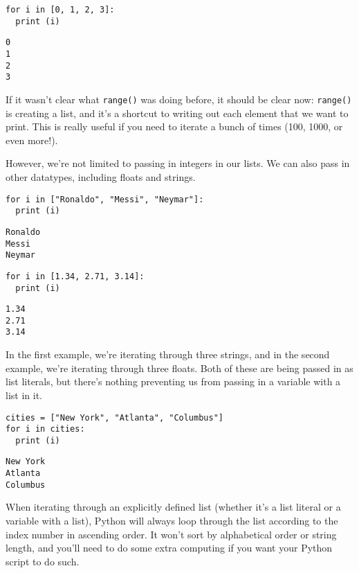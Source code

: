 \begin{lstlisting}[style=pippython]
for i in [0, 1, 2, 3]:
  print (i)
\end{lstlisting}
\begin{lstlisting}[style=none]
0
1
2
3
\end{lstlisting}
If it wasn't clear what \verb|range()| was doing before, it should be clear now: \verb|range()| is creating a list, and it's a shortcut to writing out each element that we want to print. This is really useful if you need to iterate a bunch of times (100, 1000, or even more!). \par
However, we're not limited to passing in integers in our lists. We can also pass in other datatypes, including floats and strings.\par
\begin{lstlisting}[style=pippython]
for i in ["Ronaldo", "Messi", "Neymar"]:
  print (i)
\end{lstlisting}
\begin{lstlisting}
Ronaldo
Messi
Neymar
\end{lstlisting}
\begin{lstlisting}[style=pippython]
for i in [1.34, 2.71, 3.14]:
  print (i)
\end{lstlisting}
\begin{lstlisting}
1.34
2.71
3.14
\end{lstlisting}
In the first example, we're iterating through three strings, and in the second example, we're iterating through three floats. Both of these are being passed in as list literals, but there's nothing preventing us from passing in a variable with a list in it.\par
\begin{lstlisting}[style=pippython]
cities = ["New York", "Atlanta", "Columbus"]
for i in cities:
  print (i)
\end{lstlisting}
\begin{lstlisting}
New York
Atlanta
Columbus
\end{lstlisting}
When iterating through an explicitly defined list (whether it's a list literal or a variable with a list), Python will always loop through the list according to the index number in ascending order. It won't sort by alphabetical order or string length, and you'll need to do some extra computing if you want your Python script to do such.
